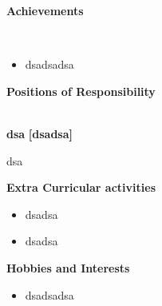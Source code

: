 \documentclass[a4paper,10pt]{article}
\begin{document}
\colorbox{titleColor}{\parbox{6.7in}{\textbf{Achievements}}}\\[0.08in]

    \begin{itemize} 
 \setlength{\itemsep}{1pt}
\item dsadsadsa
\end{itemize}

\colorbox{titleColor}{\parbox{6.7in}{\textbf{Positions of Responsibility}}}\\

\textbf{dsa}  \hfill {\small{{\textbf{[dsadsa]}}}\/} 
\begin{itemize*} 

        \item dsa 

        \end{itemize*}

\colorbox{titleColor}{\parbox{6.7in}{\textbf{Extra Curricular activities}}}

\begin{itemize}

    \setlength{\itemsep}{1pt}
\item dsadsa \hfill 
\item dsadsa \hfill 
\end{itemize}

\colorbox{titleColor}{\parbox{6.7in}{\textbf{Hobbies and Interests}}}

\begin{itemize}
        \setlength{\itemsep}{1pt}
\item dsadsadsa
\end{itemize}
\end{document}
